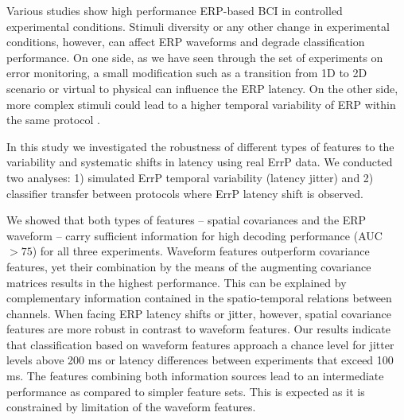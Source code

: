 \documentclass[12pt]{iopart}
\begin{document}
Various studies show high 
performance  ERP-based BCI in controlled experimental conditions.
Stimuli diversity or any other change in experimental conditions, however,
can affect ERP waveforms and degrade classification performance.
On one side, as we have seen through the set of experiments on error monitoring,
a small modification such as a transition from 1D to 2D scenario
or virtual to physical can influence the ERP latency.
On the other side, more complex stimuli
could lead to a higher temporal variability of ERP within the same protocol  \cite{arico_evaluation_2013}.


In this study we investigated the robustness of different types of features
to the variability and systematic shifts in latency using real ErrP data.
We conducted two analyses: 1) simulated ErrP temporal variability (latency jitter)
and 2) classifier transfer between protocols where ErrP latency shift is observed.

We showed that both types of features -- spatial covariances and the ERP waveform --
carry sufficient information for high decoding performance (AUC $> 75$) for all three experiments.
Waveform features outperform covariance features, yet their combination
by the means of the augmenting covariance matrices results
in the highest performance. This can be explained by complementary 
information contained in the spatio-temporal relations between channels.
When facing ERP latency shifts or jitter, however,
spatial covariance features are more robust in contrast to waveform features.
Our results indicate that classification based on waveform features approach a chance level
for jitter levels above 200 ms or latency differences
between experiments that exceed 100 ms.
The features combining both information sources lead to an intermediate
performance as compared to simpler feature sets.
This is expected as it is constrained by limitation
of the waveform features. 
\end{document}
